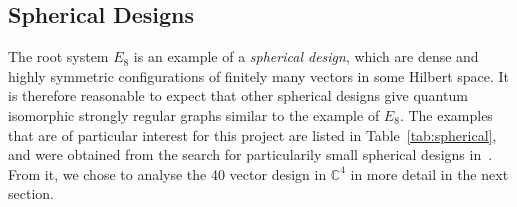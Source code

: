 \subsection{Spherical Designs}

The root system $E_8$ is an example of a \emph{spherical design},
which are dense and highly symmetric configurations of finitely many vectors in some Hilbert space.
It is therefore reasonable to expect that other spherical designs give quantum
isomorphic strongly regular graphs similar to the example of $E_8$.
The examples that are of particular interest for this project are listed in Table~\ref{tab:spherical},
and were obtained from the search for particularily small spherical designs in~\cite{HUGHES202184}.
From it, we chose to analyse the 40 vector design in $\mathbb{C}^4$ in more detail in the next section.

\begin{table}
    \centering
    \caption{
        Overview of spherical $(t, t)$-designs and their properties, extended from~\cite{HUGHES202184}.
        The entry in column \emph{Orthogonality Graph} contains the strongly regular graph parameters.
    }\label{tab:spherical}
\end{table}


